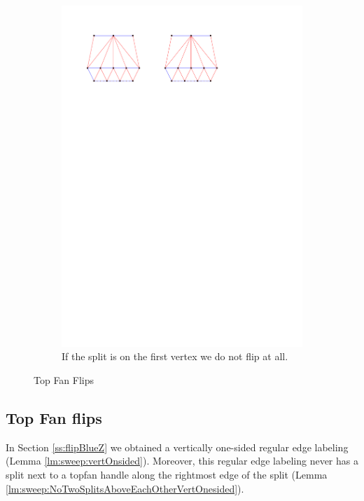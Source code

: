 \begin{figure}[!b]
\begin{subfigure}[b]{0.45 \textwidth}
        \includegraphics[width =\textwidth]{topFanFlips/img/splitfront}
        \caption{If the split is on the first vertex we do not flip at all.}
        \label{fig:fanflip:splitFirstVertex}
    \end{subfigure}

    \caption{Top Fan Flips}
    \label{fig:fanflip:fanflips}
\end{figure}

\subsection{Top Fan flips}
\thispagestyle{plain}
\label{ss:fanflip}

In Section \ref{ss:flipBlueZ} we obtained a vertically one-sided regular edge labeling (Lemma \ref{lm:sweep:vertOnsided}).
Moreover, this regular edge labeling never has a split next to a topfan handle along the rightmost edge of the split (Lemma \ref{lm:sweep:NoTwoSplitsAboveEachOtherVertOnesided}). 

